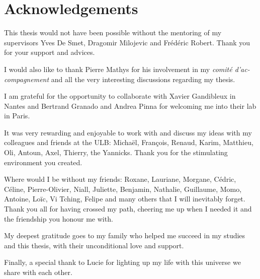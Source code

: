 \chapter{Acknowledgements}

This thesis would not have been possible without the mentoring of my supervisors Yves De Smet, Dragomir Milojevic and Frédéric Robert. Thank you for your support and advices.

I would also like to thank Pierre Mathys for his involvement in my \textit{comité d'ac-compagnement} and all the very interesting discussions regarding my thesis.

I am grateful for the opportunity to collaborate with Xavier Gandibleux in Nantes and Bertrand Granado and Andrea Pinna for welcoming me into their lab in Paris.

It was very rewarding and enjoyable to work with and discuss my ideas with my colleagues and friends at the ULB: Michaël, François, Renaud, Karim, Matthieu, Oli, Antoun, Axel, Thierry, the Yannicks. Thank you for the stimulating environment you created.

Where would I be without my friends: Roxane, Lauriane, Morgane, Cédric, Céline, Pierre-Olivier, Niall, Juliette, Benjamin, Nathalie, Guillaume, Momo, Antoine, Loïc, Vi Tching, Felipe and many others that I will inevitably forget. Thank you all for having crossed my path, cheering me up when I needed it and the friendship you honour me with.

My deepest gratitude goes to my family who helped me succeed in my studies and this thesis, with their unconditional love and support.

Finally, a special thank to Lucie for lighting up my life with this universe we share with each other.